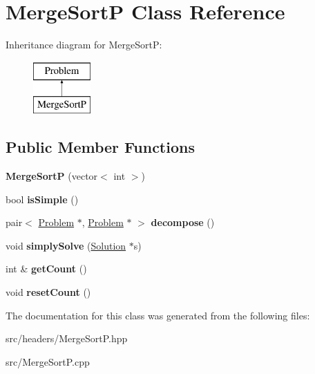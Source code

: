 \hypertarget{classMergeSortP}{\section{Merge\-Sort\-P Class Reference}
\label{classMergeSortP}
}
Inheritance diagram for Merge\-Sort\-P\-:\begin{figure}[H]
\begin{center}
\leavevmode
\includegraphics[height=2.000000cm]{classMergeSortP}
\end{center}
\end{figure}
\subsection*{Public Member Functions}
\begin{DoxyCompactItemize}
\item 
\hypertarget{classMergeSortP_ab7c5a3031e2b78cea226a29f9b7d6d5b}{{\bfseries Merge\-Sort\-P} (vector$<$ int $>$)}\label{classMergeSortP_ab7c5a3031e2b78cea226a29f9b7d6d5b}

\item 
\hypertarget{classMergeSortP_a7a212b9f90c98f951b71f6e56b9f653c}{bool {\bfseries is\-Simple} ()}\label{classMergeSortP_a7a212b9f90c98f951b71f6e56b9f653c}

\item 
\hypertarget{classMergeSortP_a362a085252146bb26efab7403d4a8478}{pair$<$ \hyperlink{classProblem}{Problem} $\ast$, \hyperlink{classProblem}{Problem} $\ast$ $>$ {\bfseries decompose} ()}\label{classMergeSortP_a362a085252146bb26efab7403d4a8478}

\item 
\hypertarget{classMergeSortP_ad107af3328d6ec7194d840bf73416ef7}{void {\bfseries simply\-Solve} (\hyperlink{classSolution}{Solution} $\ast$s)}\label{classMergeSortP_ad107af3328d6ec7194d840bf73416ef7}

\item 
\hypertarget{classMergeSortP_a9c953d6bbf847cdd1651a4cce4fb9423}{int \& {\bfseries get\-Count} ()}\label{classMergeSortP_a9c953d6bbf847cdd1651a4cce4fb9423}

\item 
\hypertarget{classMergeSortP_ada4b59301540fadc232bff2b20bf7bf5}{void {\bfseries reset\-Count} ()}\label{classMergeSortP_ada4b59301540fadc232bff2b20bf7bf5}

\end{DoxyCompactItemize}


The documentation for this class was generated from the following files\-:\begin{DoxyCompactItemize}
\item 
src/headers/Merge\-Sort\-P.\-hpp\item 
src/Merge\-Sort\-P.\-cpp\end{DoxyCompactItemize}
